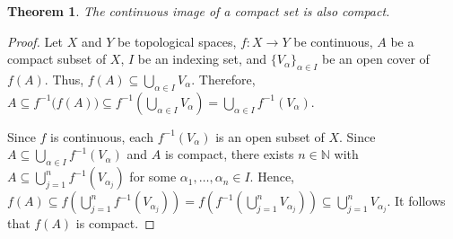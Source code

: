 \documentclass[12pt]{article}
\newtheorem{thm*}{Theorem}
\def\sub{\subseteq}
\begin{document}
\begin{thm*}
The continuous image of a compact set is also compact.
\end{thm*}

\begin{proof}
Let $X$ and $Y$ be topological spaces, $f \colon X \to Y$ be continuous, $A$ be a compact subset of $X$, $I$ be an indexing set, and $\{V_\alpha\}_{\alpha\in I}$ be an open cover of $f(A)$.  Thus, $\displaystyle f(A)\sub \bigcup_{\alpha\in I} V_\alpha$.  Therefore, $\displaystyle A\sub f^{-1}\bigg( f(A) \bigg) \sub f^{-1} \left( \bigcup_{\alpha\in I} V_{\alpha} \right)=\bigcup_{\alpha\in I} f^{-1} (V_\alpha)$.

Since $f$ is continuous, each $f^{-1}(V_\alpha)$ is an open subset of $X$.  Since $\displaystyle A\sub \bigcup_{\alpha\in I} f^{-1} (V_\alpha)$ and $A$ is compact, there exists $n \in \mathbb{N}$ with $\displaystyle A\sub\bigcup_{j=1}^n f^{-1} \left( V_{\alpha_j} \right)$ for some $\alpha_1, \dots , \alpha_n \in I$.  Hence, $\displaystyle f(A)\sub f \left( \bigcup_{j=1}^n f^{-1} (V_{\alpha_j}) \right)=f\left( f^{-1} \left( \bigcup_{j=1}^n V_{\alpha_j} \right) \right) \sub \bigcup_{j=1}^n V_{\alpha_j}$.  It follows that $f(A)$ is compact.
\end{proof}
\end{document}
